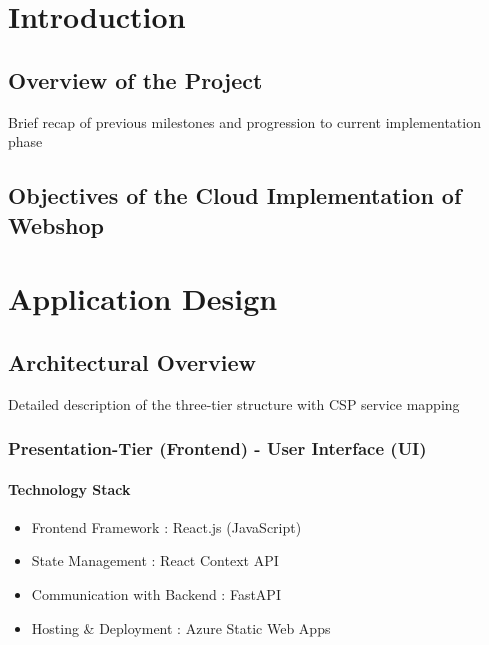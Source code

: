 \documentclass{llncs}
\begin{document}
\section{Introduction}
\subsection{Overview of the Project}
Brief recap of previous milestones and progression to current implementation phase

\subsection{Objectives of the Cloud Implementation of Webshop}


\section{Application Design}
\subsection{Architectural Overview}
Detailed description of the three-tier structure with CSP service mapping
\subsubsection{Presentation-Tier (Frontend) - User Interface (UI)}
\paragraph{Technology Stack}
\begin{itemize}
    \item Frontend Framework : React.js (JavaScript)
    \item State Management : React Context API
    \item Communication with Backend : FastAPI
    \item Hosting \& Deployment : Azure Static Web Apps
 
\end{itemize}
\end{document}
